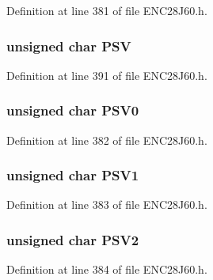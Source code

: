 Definition at line 381 of file E\+N\+C28\+J60.\+h.

\hypertarget{union___r_e_g_a37615fbd5d453807c890375988c0496e}{}
\subsubsection[{P\+S\+V}]{\setlength{\rightskip}{0pt plus 5cm}unsigned {\bf char} P\+S\+V}\label{union___r_e_g_a37615fbd5d453807c890375988c0496e}


Definition at line 391 of file E\+N\+C28\+J60.\+h.

\hypertarget{union___r_e_g_a490b691eeeb89b9cb062f039c1b037c2}{}
\subsubsection[{P\+S\+V0}]{\setlength{\rightskip}{0pt plus 5cm}unsigned {\bf char} P\+S\+V0}\label{union___r_e_g_a490b691eeeb89b9cb062f039c1b037c2}


Definition at line 382 of file E\+N\+C28\+J60.\+h.

\hypertarget{union___r_e_g_a3c6008a56cada7d6ec6b897f186bb449}{}
\subsubsection[{P\+S\+V1}]{\setlength{\rightskip}{0pt plus 5cm}unsigned {\bf char} P\+S\+V1}\label{union___r_e_g_a3c6008a56cada7d6ec6b897f186bb449}


Definition at line 383 of file E\+N\+C28\+J60.\+h.

\hypertarget{union___r_e_g_a190e7e3b56e3aa7357febbcf41cd9cf5}{}
\subsubsection[{P\+S\+V2}]{\setlength{\rightskip}{0pt plus 5cm}unsigned {\bf char} P\+S\+V2}\label{union___r_e_g_a190e7e3b56e3aa7357febbcf41cd9cf5}


Definition at line 384 of file E\+N\+C28\+J60.\+h.

